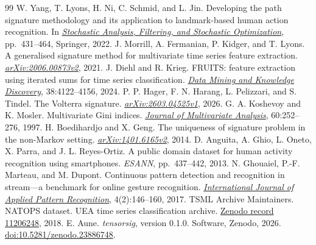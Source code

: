 \begin{thebibliography}{99}
 W. Yang, T. Lyons, H. Ni, C. Schmid, and L. Jin. Developing the path signature methodology and its application to landmark-based human action recognition. In \href{https://doi.org/10.1007/978-3-030-98519-6_18}{\emph{Stochastic Analysis, Filtering, and Stochastic Optimization}}, pp.~431--464, Springer, 2022.
 J. Morrill, A. Fermanian, P. Kidger, and T. Lyons. A generalised signature method for multivariate time series feature extraction. \href{https://arxiv.org/abs/2006.00873v2}{\emph{arXiv:2006.00873v2}}, 2021.
 J. Diehl and R. Krieg. FRUITS: feature extraction using iterated sums for time series classification. \href{https://doi.org/10.1007/s10618-024-01068-1}{\emph{Data Mining and Knowledge Discovery}}, 38:4122--4156, 2024.
 P. P. Hager, F. N. Harang, L. Pelizzari, and S. Tindel. The Volterra signature. \href{https://arxiv.org/abs/2603.04525v1}{\emph{arXiv:2603.04525v1}}, 2026.
 G. A. Koshevoy and K. Mosler. Multivariate Gini indices. \href{https://wisostat.uni-koeln.de/sites/dep_econometrics/pdf_publikationen/1997_KoshevoyM97a_Gini.pdf}{\emph{Journal of Multivariate Analysis}}, 60:252--276, 1997.
 H. Boedihardjo and X. Geng. The uniqueness of signature problem in the non-Markov setting. \href{https://arxiv.org/abs/1401.6165v2}{\emph{arXiv:1401.6165v2}}, 2014.
 D. Anguita, A. Ghio, L. Oneto, X. Parra, and J. L. Reyes-Ortiz. A public domain dataset for human activity recognition using smartphones. \emph{ESANN}, pp.~437--442, 2013.
 N. Ghouaiel, P.-F. Marteau, and M. Dupont. Continuous pattern detection and recognition in stream---a benchmark for online gesture recognition. \href{https://doi.org/10.1504/IJAPR.2017.085315}{\emph{International Journal of Applied Pattern Recognition}}, 4(2):146--160, 2017.
 TSML Archive Maintainers. NATOPS dataset. UEA time series classification archive. \href{https://doi.org/10.5281/zenodo.11206248}{Zenodo record 11206248}, 2018.
 E. Aune. \emph{tensorsig}, version 0.1.0. Software, Zenodo, 2026. \href{https://doi.org/10.5281/zenodo.23886748}{doi:10.5281/zenodo.23886748}.
\end{thebibliography}
